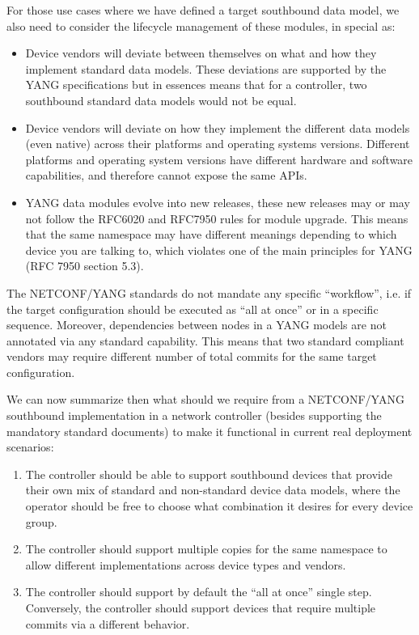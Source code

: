 \documentclass[conference]{IEEEtran}
\begin{document}
For those use cases where we have defined a target southbound data model, we also need to consider the lifecycle management of these modules, in special as:
\begin{itemize}

\item Device vendors will deviate between themselves on what and how they implement standard data models. These deviations are supported by the YANG specifications but in essences means that for a controller, two southbound standard data models would not be equal. 

\item Device vendors will deviate on how they implement the different data models (even native) across their platforms and operating systems versions. Different platforms and operating system versions have different hardware and software capabilities, and therefore cannot expose the same APIs.

\item YANG data modules evolve into new releases, these new releases may or may not follow the RFC6020 and RFC7950 rules for module upgrade. This means that the same namespace may have different meanings depending to which device you are talking to, which violates one of the main principles for YANG (RFC 7950 section 5.3).
\end{itemize}

The NETCONF/YANG standards do not mandate any specific “workflow”, i.e. if the target configuration should be executed as “all at once” or in a specific sequence. Moreover, dependencies between nodes in a YANG models are not annotated via any standard capability. This means that two standard compliant vendors may require different number of total commits for the same target configuration.

We can now summarize then what should we require from a NETCONF/YANG southbound implementation in a network controller (besides supporting the mandatory standard documents) to make it functional in current real deployment scenarios:
\begin{enumerate}
    \item The controller should be able to support southbound devices that provide their own mix of standard and non-standard device data models, where the operator should be free to choose what combination it desires for every device group.
    \item The controller should support multiple copies for the same namespace to allow different implementations across device types and vendors.
    \item The controller should support by default the “all at once” single step. Conversely, the controller should support devices that require multiple commits via a different behavior.
\end{enumerate}
\end{document}
